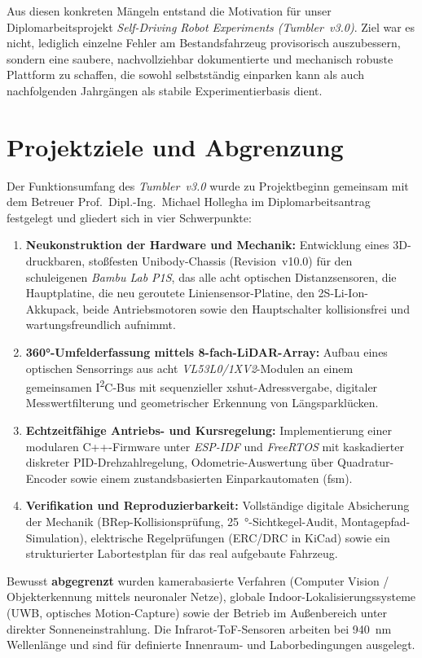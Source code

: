 Aus diesen konkreten Mängeln entstand die Motivation für unser Diplomarbeitsprojekt \emph{Self-Driving Robot Experiments (Tumbler~v3.0)}. Ziel war es nicht, lediglich einzelne Fehler am Bestandsfahrzeug provisorisch auszubessern, sondern eine saubere, nachvollziehbar dokumentierte und mechanisch robuste Plattform zu schaffen, die sowohl selbstständig einparken kann als auch nachfolgenden Jahrgängen als stabile Experimentierbasis dient.

\section{Projektziele und Abgrenzung}
\label{sec:ziele}
Der Funktionsumfang des \emph{Tumbler~v3.0} wurde zu Projektbeginn gemeinsam mit dem Betreuer Prof.~Dipl.-Ing.~Michael Hollegha im Diplomarbeitsantrag festgelegt und gliedert sich in vier Schwerpunkte:

\begin{enumerate}
  \item \textbf{Neukonstruktion der Hardware und Mechanik:} Entwicklung eines 3D-druckbaren, stoßfesten Unibody-Chassis (Revision~v10.0) für den schuleigenen \emph{Bambu Lab P1S}, das alle acht optischen Distanzsensoren, die Hauptplatine, die neu geroutete Liniensensor-Platine, den 2S-Li-Ion-Akkupack, beide Antriebsmotoren sowie den Hauptschalter kollisionsfrei und wartungsfreundlich aufnimmt.
  \item \textbf{360°-Umfelderfassung mittels 8-fach-LiDAR-Array:} Aufbau eines optischen Sensorrings aus acht \emph{VL53L0/1XV2}-Modulen an einem gemeinsamen I\textsuperscript{2}C-Bus mit sequenzieller \gls{xshut}-Adressvergabe, digitaler Messwertfilterung und geometrischer Erkennung von Längsparklücken.
  \item \textbf{Echtzeitfähige Antriebs- und Kursregelung:} Implementierung einer modularen C++-Firmware unter \emph{ESP-IDF} und \emph{FreeRTOS} mit kaskadierter diskreter PID-Drehzahlregelung, Odometrie-Auswertung über Quadratur-Encoder sowie einem zustandsbasierten Einparkautomaten (\gls{fsm}).
  \item \textbf{Verifikation und Reproduzierbarkeit:} Vollständige digitale Absicherung der Mechanik (BRep-Kollisionsprüfung, \qty{25}{\degree}-Sichtkegel-Audit, Montagepfad-Simulation), elektrische Regelprüfungen (ERC/DRC in KiCad) sowie ein strukturierter Labortestplan für das real aufgebaute Fahrzeug.
\end{enumerate}

Bewusst \textbf{abgegrenzt} wurden kamerabasierte Verfahren (Computer Vision / Objekterkennung mittels neuronaler Netze), globale Indoor-Lokalisierungssysteme (UWB, optisches Motion-Capture) sowie der Betrieb im Außenbereich unter direkter Sonneneinstrahlung. Die Infrarot-ToF-Sensoren arbeiten bei \qty{940}{\nano\meter} Wellenlänge und sind für definierte Innenraum- und Laborbedingungen ausgelegt.

